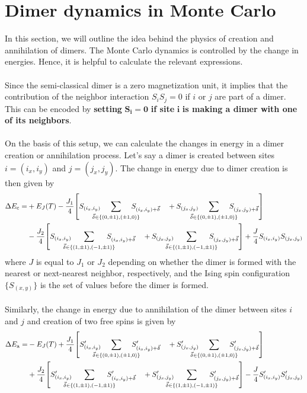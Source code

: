\documentclass[../journal_main.tex]{subfiles}
\begin{document}
\section{Dimer dynamics in Monte Carlo} %
In this section, we will outline the idea behind the physics of creation and annihilation of dimers. The Monte Carlo dynamics is controlled by the change in energies. Hence, it is helpful to calculate the relevant expressions.~\\~\\
Since the semi-classical dimer is a zero magnetization unit, it implies that the contribution of the neighbor interaction $S_i S_j = 0$ if $i$ or $j$ are part of a dimer. This can be encoded by \textbf{setting} $\boldsymbol{S_i = 0}$ \textbf{if site} $\boldsymbol{i}$ \textbf{is making a dimer with one of its neighbors}.~\\~\\
On the basis of this setup, we can calculate the changes in energy in a dimer creation or annihilation process. Let's say a dimer is created between sites $i = (i_x, i_y)$ and $j = (j_x, j_y)$. The change in energy due to dimer creation is then given by
\begin{align*}
    \Delta E_\text{c} =  & + E_J(T) -\frac{J_1}{4} \qty[S_{(i_x, i_y)} \!\!\!\!\!\!\!\! \sum_{\vec{\delta} \in \{(0,\pm 1), (\pm 1, 0) \}} \!\!\!\!\!\!\!\! S_{(i_x, i_y) + \vec{\delta}} \quad + S_{(j_x, j_y)} \!\!\!\!\!\!\!\! \sum_{\vec{\delta} \in \{(0,\pm 1), (\pm 1, 0) \}} \!\!\!\!\!\!\!\! S_{(j_x, j_y) + \vec{\delta}}] \\
    & -\frac{J_2}{4} \qty[S_{(i_x, i_y)} \!\!\!\!\!\!\!\! \sum_{\vec{\delta} \in \{(1,\pm 1), (-1,\pm 1) \}} \!\!\!\!\!\!\!\! S_{(i_x, i_y) + \vec{\delta}} \quad + S_{(j_x, j_y)} \!\!\!\!\!\!\!\! \sum_{\vec{\delta} \in \{(1,\pm 1), (-1,\pm 1) \}} \!\!\!\!\!\!\!\! S_{(j_x, j_y) + \vec{\delta}}] + \frac{J}{4} S_{(i_x, i_y)} S_{(j_x, j_y)}
\end{align*}
where $J$ is equal to $J_1$ or $J_2$ depending on whether the dimer is formed with the nearest or next-nearest neighbor, respectively, and the Ising spin configuration $\{S_{(x,y)}\}$ is the set of values before the dimer is formed. ~\\~\\
Similarly, the change in energy due to annihilation of the dimer between sites $i$ and $j$ and creation of two free spins is given by
\begin{align*}
    \Delta E_\text{a} =  & -E_J(T) +\frac{J_1}{4} \qty[S'_{(i_x, i_y)} \!\!\!\!\!\!\!\! \sum_{\vec{\delta} \in \{(0,\pm 1), (\pm 1, 0) \}} \!\!\!\!\!\!\!\! S'_{(i_x, i_y) + \vec{\delta}} \quad + S'_{(j_x, j_y)} \!\!\!\!\!\!\!\! \sum_{\vec{\delta} \in \{(0,\pm 1), (\pm 1, 0) \}} \!\!\!\!\!\!\!\! S'_{(j_x, j_y) + \vec{\delta}}] \\
    & +\frac{J_2}{4} \qty[S'_{(i_x, i_y)} \!\!\!\!\!\!\!\! \sum_{\vec{\delta} \in \{(1,\pm 1), (-1,\pm 1) \}} \!\!\!\!\!\!\!\! S'_{(i_x, i_y) + \vec{\delta}} \quad + S'_{(j_x, j_y)} \!\!\!\!\!\!\!\! \sum_{\vec{\delta} \in \{(1,\pm 1), (-1,\pm 1) \}} \!\!\!\!\!\!\!\! S'_{(j_x, j_y) + \vec{\delta}}] - \frac{J}{4} S'_{(i_x, i_y)} S'_{(j_x, j_y)}
\end{align*}
\end{document}
